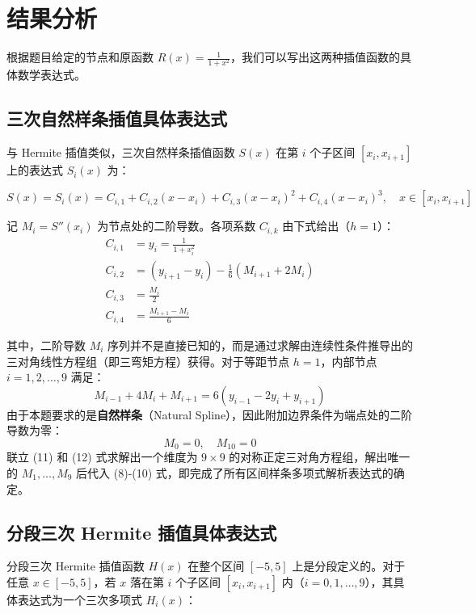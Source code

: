 \documentclass{article}
\begin{document}
\section{结果分析}
根据题目给定的节点和原函数 $R(x)=\frac{1}{1+x^2}$，我们可以写出这两种插值函数的具体数学表达式。
\subsection{三次自然样条插值具体表达式}
与 Hermite 插值类似，三次自然样条插值函数 $S(x)$ 在第 $i$ 个子区间 $[x_i, x_{i+1}]$ 上的表达式 $S_i(x)$ 为：

\begin{equation}
    S(x) = S_i(x) = C_{i,1} + C_{i,2}(x - x_i) + C_{i,3}(x - x_i)^2 + C_{i,4}(x - x_i)^3, \quad x \in [x_i, x_{i+1}]
\end{equation}

记 $M_i = S''(x_i)$ 为节点处的二阶导数。各项系数 $C_{i,k}$ 由下式给出（$h=1$）：
\begin{align}
    C_{i,1} &= y_i = \frac{1}{1+x_i^2} \\
    C_{i,2} &= (y_{i+1} - y_i) - \frac{1}{6}(M_{i+1} + 2M_i) \\
    C_{i,3} &= \frac{M_i}{2} \\
    C_{i,4} &= \frac{M_{i+1} - M_i}{6}
\end{align}

其中，二阶导数 $M_i$ 序列并不是直接已知的，而是通过求解由连续性条件推导出的三对角线性方程组（即三弯矩方程）获得。对于等距节点 $h=1$，内部节点 $i = 1, 2, \dots, 9$ 满足：
\begin{equation}
    M_{i-1} + 4M_i + M_{i+1} = 6(y_{i-1} - 2y_i + y_{i+1})
\end{equation}
由于本题要求的是\textbf{自然样条}（Natural Spline），因此附加边界条件为端点处的二阶导数为零：
\begin{equation}
    M_0 = 0, \quad M_{10} = 0
\end{equation}
联立 (11) 和 (12) 式求解出一个维度为 $9 \times 9$ 的对称正定三对角方程组，解出唯一的 $M_1, \dots, M_9$ 后代入 (8)-(10) 式，即完成了所有区间样条多项式解析表达式的确定。

\subsection{分段三次 Hermite 插值具体表达式}
分段三次 Hermite 插值函数 $H(x)$ 在整个区间 $[-5, 5]$ 上是分段定义的。对于任意 $x \in [-5, 5]$，若 $x$ 落在第 $i$ 个子区间 $[x_i, x_{i+1}]$ 内（$i = 0, 1, \dots, 9$），其具体表达式为一个三次多项式 $H_i(x)$：
\end{document}
